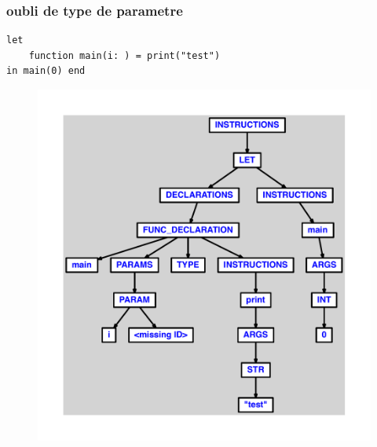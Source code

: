 \documentclass{article}
\begin{document}
\subsubsection{oubli de type de parametre}
\begin{lstlisting}
let
	function main(i: ) = print("test")
in main(0) end
\end{lstlisting}
\newpage
\begin{figure}[H]
\centering
\includegraphics[max width=\textwidth]{ast/ast_219.pdf}
\end{figure}
\newpage
\end{document}
